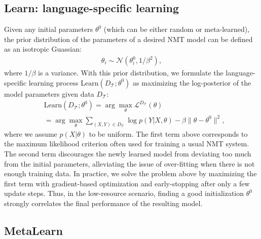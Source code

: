 \subsection{Learn: language-specific learning}
\label{cp6.sec.lsl}
Given any initial parameters $\theta^0$ (which can be either random or meta-learned), 
the prior distribution of the parameters of a desired NMT model can be defined %
as an isotropic Guassian:
\begin{align}
    \theta_i \sim \mathcal{N}(\theta^0_i, 1/\beta^2),
\end{align}
where $1/\beta$ is a variance. With this prior distribution, we formulate the language-specific learning process $\text{Learn}(D_\mathcal{T}; \theta^0)$ as maximizing the log-posterior of the model parameters given data $D_{\mathcal{T}}$:
\begin{equation}
	\begin{split}
    &\text{Learn}(D_\mathcal{T}; \theta^0) = 
    \arg\max_{\theta} \mathcal{L}^{D_\mathcal{T}} (\theta)
    \\
    &=\arg\max_{\theta}\!\!\!\!
    \sum_{(X,Y) \in D_{\mathcal{T}}} \!\! \!\!
    \log p(Y | X, \theta)  
    - \beta \| \theta - \theta^0 \|^2,
\end{split}
\end{equation}
where we assume $p(X|\theta)$ to be uniform. 
The first term above corresponds to the maximum likelihood criterion often used for training a usual NMT system. The second term discourages the newly learned model from deviating too much from the initial parameters, alleviating the issue of over-fitting when there is not enough training data. In practice, we solve the problem above by maximizing the first term with gradient-based optimization and early-stopping after only a few update steps. Thus, in the low-resource scenario, finding a good initialization $\theta^0$ strongly correlates the final performance of the resulting model.


\subsection{MetaLearn}
\label{cp6.sec.ml}

